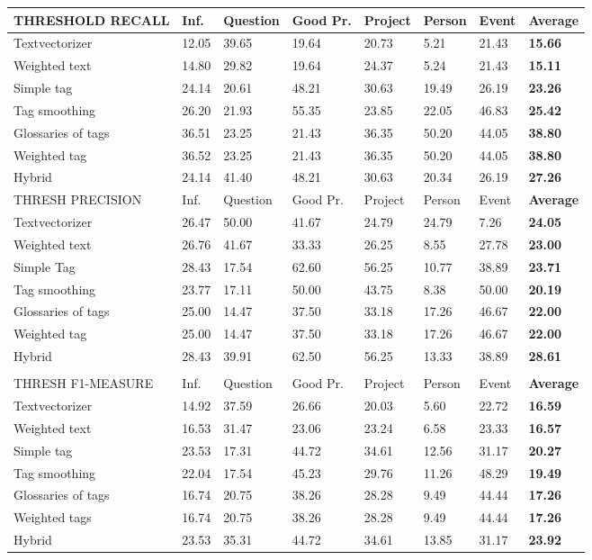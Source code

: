 \begin{table}
\begin{tabular}{| l | l | l | l | l | l | l | l |}
\hline
THRESHOLD RECALL & Inf. &  Question &  Good Pr.& Project & Person &  Event & {\bf Average} \\
\hline
Textvectorizer & 12.05 & 39.65 & 19.64 & 20.73 & 5.21 & 21.43 & {\bf 15.66}\\
Weighted text & 14.80 & 29.82 & 19.64 & 24.37 & 5.24 & 21.43 & {\bf 15.11}\\
Simple tag & 24.14 & 20.61 & 48.21 & 30.63 & 19.49 & 26.19 & {\bf 23.26}\\
Tag smoothing & 26.20 & 21.93 & 55.35 & 23.85 & 22.05 & 46.83 & {\bf 25.42}\\
Glossaries of tags & 36.51 & 23.25 & 21.43 & 36.35 & 50.20 & 44.05 & {\bf 38.80}\\
Weighted tag & 36.52 & 23.25 & 21.43 & 36.35 & 50.20 & 44.05 & {\bf 38.80}\\
Hybrid & 24.14 & 41.40 & 48.21 & 30.63 & 20.34 & 26.19 & {\bf 27.26}\\
\hline

\hline
THRESH PRECISION & Inf. &  Question &  Good Pr.& Project & Person &  Event & {\bf Average} \\
\hline
Textvectorizer & 26.47 & 50.00 & 41.67 & 24.79 & 24.79 & 7.26 & {\bf 24.05}\\
Weighted text & 26.76 & 41.67 & 33.33 & 26.25 & 8.55 & 27.78 & {\bf 23.00}\\
Simple Tag & 28.43 & 17.54 & 62.60 & 56.25 & 10.77 & 38.89 & {\bf 23.71}\\
Tag smoothing &  23.77 & 17.11 & 50.00& 43.75 & 8.38 & 50.00 &{\bf 20.19 } \\
Glossaries of tags & 25.00 & 14.47 & 37.50 & 33.18 & 17.26 & 46.67 & {\bf 22.00}\\
Weighted tag & 25.00 & 14.47 & 37.50 & 33.18 & 17.26 & 46.67 & {\bf 22.00}\\
Hybrid & 28.43 & 39.91 & 62.50 & 56.25 & 13.33 & 38.89 & {\bf 28.61}\\
\hline
\\
\hline
THRESH F1-MEASURE & Inf. &  Question &  Good Pr.& Project & Person &  Event & {\bf Average} \\
\hline
Textvectorizer & 14.92 & 37.59 & 26.66 & 20.03 & 5.60 &  22.72 & {\bf 16.59 } \\
Weighted text & 16.53 & 31.47 & 23.06 & 23.24 & 6.58 & 23.33 & {\bf 16.57 } \\
Simple tag & 23.53 & 17.31 & 44.72 & 34.61 & 12.56 & 31.17& {\bf 20.27} \\
Tag smoothing & 22.04 & 17.54 & 45.23 & 29.76 & 11.26 & 48.29  &{\bf 19.49} \\
Glossaries of tags & 16.74 & 20.75 & 38.26 & 28.28 & 9.49 & 44.44 &{\bf 17.26} \\
Weighted tags & 16.74 & 20.75 & 38.26 & 28.28 & 9.49 & 44.44 &{\bf 17.26} \\
Hybrid &  23.53 & 35.31 & 44.72 & 34.61 & 13.85 & 31.17 &{\bf 23.92} \\
\hline
\end{tabular}


\end{table}
